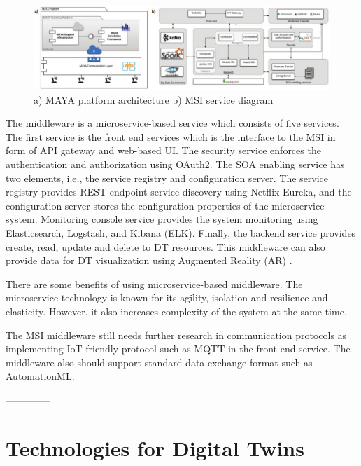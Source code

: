 \documentclass[article]{aaltoseries}
\begin{document}
\begin{figure}[t!]
	\begin{center}
		\includegraphics[width=1\textwidth]{figures/maya_platform}
		\caption{a) MAYA platform architecture b) MSI service diagram \cite{ciavotta2017microservice}}
		\label{fig:maya_platform}
	\end{center}
\end{figure}

The middleware is a microservice-based service which consists of five services. The first service is the front end services which is the interface to the MSI in form of API gateway and web-based UI. The security service enforces the authentication and authorization using OAuth2. The SOA enabling service has two elements, i.e., the service registry and configuration server. The service registry provides REST endpoint service discovery using Netflix Eureka, and the configuration server stores the configuration properties of the microservice system. Monitoring console service provides the system monitoring using Elasticsearch, Logstash, and Kibana (ELK). Finally, the backend service provides create, read, update and delete to DT resources. This middleware can also provide data for DT visualization using Augmented Reality (AR) \cite{schroeder2016visualising}.

There are some benefits of using microservice-based middleware. The microservice technology is known for its agility, isolation and resilience and elasticity. However, it also increases complexity of the system at the same time.

The MSI middleware still needs further research in communication protocols as implementing IoT-friendly protocol such as MQTT in the front-end service. The middleware also should support standard data exchange format such as AutomationML.




--------------

\section{Technologies for Digital Twins}
\end{document}
